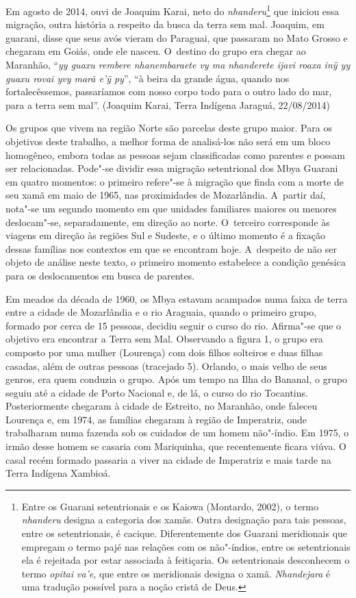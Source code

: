 Em agosto de 2014, ouvi de Joaquim Karai, neto do
\emph{nhanderu}\footnote{Entre os Guarani setentrionais e os Kaiowa (Montardo,
2002), o termo \emph{nhanderu} designa a categoria dos xamãs. Outra designação
para tais pessoas, entre os setentrionais, é cacique. Diferentemente
dos Guarani meridionais que empregam o termo pajé nas relações com os
não"-índios, entre os setentrionais ela é rejeitada por estar associada à
feitiçaria. Os setentrionais desconhecem o termo \emph{opitai va’e}, que entre
os meridionais designa o xamã. \emph{Nhandejara} é uma tradução possível para
a noção cristã de Deus.} que iniciou essa migração, outra história a
respeito da busca da terra sem mal. Joaquim, em guarani, disse que seus
avós vieram do Paraguai, que passaram no Mato Grosso e chegaram em
Goiás, onde ele nasceu. O~destino do grupo era chegar ao Maranhão, ``\emph{yy
guaxu rembere nhanembaraete vy ma nhanderete ijavi roaxa inÿ yy guaxu
rovai yvy marã e’ÿ py}'', ``à beira da grande água, quando nos
fortalecêssemos, passaríamos com nosso corpo todo para o outro lado do
mar, para a terra sem mal''. (Joaquim Karai, Terra Indígena Jaraguá,
22/08/2014)

Os grupos que vivem na região Norte são parcelas deste grupo maior. Para
os objetivos deste trabalho, a melhor forma de analisá-los não será em
um bloco homogêneo, embora todas as pessoas sejam classificadas como
parentes e possam ser relacionadas. Pode"-se dividir essa migração
setentrional dos Mbya Guarani em quatro momentos: o primeiro refere"-se
à migração que finda com a morte de seu xamã em maio de 1965, nas
proximidades de Mozarlândia. A~partir daí, nota"-se um segundo momento
em que unidades familiares maiores ou menores deslocam"-se,
separadamente, em direção ao norte. O~terceiro corresponde às viagens
em direção às regiões Sul e Sudeste, e o último momento é a fixação
dessas famílias nos contextos em que se encontram hoje. A~despeito de
não ser objeto de análise neste texto, o primeiro momento estabelece a
condição genésica para os deslocamentos em busca de parentes.

Em meados da década de 1960, os Mbya estavam acampados numa faixa de
terra entre a cidade de Mozarlândia e o rio Araguaia, quando o primeiro
grupo, formado por cerca de 15 pessoas, decidiu seguir o curso do rio.
Afirma"-se que o objetivo era encontrar a Terra sem Mal. Observando a
figura 1, o grupo era composto por uma mulher (Lourença) com dois
filhos solteiros e duas filhas casadas, além de outras pessoas
(tracejado 5). Orlando, o mais velho de seus genros, era quem conduzia
o grupo. Após um tempo na Ilha do Bananal, o grupo seguiu até a cidade
de Porto Nacional e, de lá, o curso do rio Tocantins. Posteriormente
chegaram à cidade de Estreito, no Maranhão, onde faleceu Lourença e, em
1974, as famílias chegaram à região de Imperatriz, onde trabalharam
numa fazenda sob os cuidados de um homem não"-índio. Em 1975, o irmão
desse homem se casaria com Mariquinha, que recentemente ficara viúva. O
casal recém formado passaria a viver na cidade de Imperatriz e mais
tarde na Terra Indígena Xambioá. 

